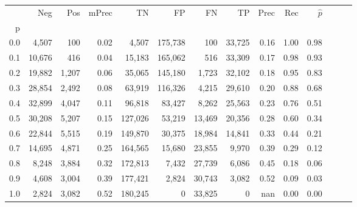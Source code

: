 \begin{tabular}{rrrrrrrrrrrrrr}
\toprule
{} &     Neg &    Pos & mPrec &       TN &       FP &      FN &      TP &  Prec &   Rec & $\hat{p}$ \\
p   &         &        &       &          &          &         &         &       &       &           \\
\midrule
0.0 &   4,507 &    100 &  0.02 &    4,507 &  175,738 &     100 &  33,725 &  0.16 &  1.00 &      0.98 \\
0.1 &  10,676 &    416 &  0.04 &   15,183 &  165,062 &     516 &  33,309 &  0.17 &  0.98 &      0.93 \\
0.2 &  19,882 &  1,207 &  0.06 &   35,065 &  145,180 &   1,723 &  32,102 &  0.18 &  0.95 &      0.83 \\
0.3 &  28,854 &  2,492 &  0.08 &   63,919 &  116,326 &   4,215 &  29,610 &  0.20 &  0.88 &      0.68 \\
0.4 &  32,899 &  4,047 &  0.11 &   96,818 &   83,427 &   8,262 &  25,563 &  0.23 &  0.76 &      0.51 \\
0.5 &  30,208 &  5,207 &  0.15 &  127,026 &   53,219 &  13,469 &  20,356 &  0.28 &  0.60 &      0.34 \\
0.6 &  22,844 &  5,515 &  0.19 &  149,870 &   30,375 &  18,984 &  14,841 &  0.33 &  0.44 &      0.21 \\
0.7 &  14,695 &  4,871 &  0.25 &  164,565 &   15,680 &  23,855 &   9,970 &  0.39 &  0.29 &      0.12 \\
0.8 &   8,248 &  3,884 &  0.32 &  172,813 &    7,432 &  27,739 &   6,086 &  0.45 &  0.18 &      0.06 \\
0.9 &   4,608 &  3,004 &  0.39 &  177,421 &    2,824 &  30,743 &   3,082 &  0.52 &  0.09 &      0.03 \\
1.0 &   2,824 &  3,082 &  0.52 &  180,245 &        0 &  33,825 &       0 &   nan &  0.00 &      0.00 \\
\bottomrule
\end{tabular}
